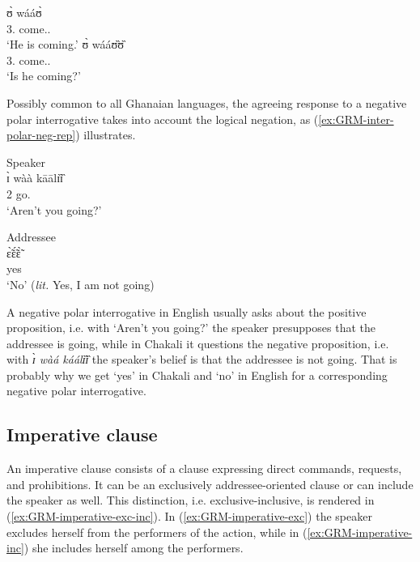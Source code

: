 \begin{multicols}{2}
\ea
\gll ʊ̀ wááʊ̀\\
{3.\sg} come.{\ipfv .\foc}\\
\glt  `He is coming.'
\ex 
\gll ʊ̀ wááʊ̏ʊ̏ \\
{3.\sg} come.{\ipfv .\foc}\\
\glt `Is he coming?'%

\z 
\end{multicols}
 \z

Possibly common to all Ghanaian languages, the  agreeing response
to a  negative polar interrogative
  takes into account the logical negation, as 
(\ref{ex:GRM-inter-polar-neg-rep}) illustrates. 



\ea\label{ex:GRM-inter-polar-neg-rep}

\begin{multicols}{2}
\ea\label{ex:GRM-inter-polar-neg-rep-S}{\rm Speaker}\\
\gll  ɪ̀ wàà kāālɪ̏ɪ̏\\
{2\sg} {\neg} go.{\q}\\
\glt `Aren't you going?'

\ex\label{ex:GRM-inter-polar-neg-rep-A}{\rm Addressee}\\
\gll ɛ̃̀ɛ̃́ɛ̃̀\\
yes\\
\glt `No' ({\it lit.} Yes, I am not going)


\z 
\end{multicols}
 \z

A negative polar interrogative in English usually asks about the
positive proposition, i.e. with `Aren't you going?' the speaker presupposes 
  that the addressee is going,   while in Chakali it questions the
negative proposition, i.e. with {\it  ɪ̀ wàá káálɪ̏ɪ̏} the speaker's belief
is that the addressee is not going. That is probably why we get `yes' in Chakali
and `no' in English for a corresponding negative polar interrogative.



\subsection{Imperative clause}
\label{sec:GRM-imper-clause}

An imperative clause consists of a clause  expressing direct commands, 
requests, and prohibitions. It can be an exclusively addressee-oriented clause 
or  can include the speaker as well. This distinction, i.e. 
exclusive-inclusive, is rendered in  (\ref{ex:GRM-imperative-exc-inc}). In 
(\ref{ex:GRM-imperative-exc}) the  speaker excludes herself  from the 
performers of the action, while in  (\ref{ex:GRM-imperative-inc}) she includes 
herself among the performers.

